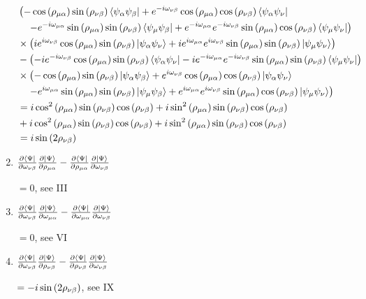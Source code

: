 \documentclass{aux/ttuthes2007}
\newcommand{\bra}[1]{\ensuremath{\left\langle#1\right\vert}}
\newcommand{\ket}[1]{\ensuremath{\left|#1\right\rangle}}
\newcommand{\s}[1]{\sin\left( #1 \right)}
\newcommand{\ssq}[1]{\sin^2\left( #1 \right)}
\newcommand{\co}[1]{\cos\left( #1 \right)}
\newcommand{\cosq}[1]{\cos^2\left( #1 \right)}
\newcommand{\kpp}[1]{\frac{\partial \ket\Psi}{\partial #1}}
\newcommand{\bpp}[1]{\frac{\partial \bra\Psi}{\partial #1}}
\newcommand{\ind}[1]{{\uo #1 \oo #1}}
\newcommand{\uo}[1]{
		\IfEqCase{#1}{
			{0}{\mu}
			{1}{\nu}
			{2}{\xi}
		}[\PackageError{uo}{Undefined option to uo: #1}{}]
}
\newcommand{\oo}[1]{
		\IfEqCase{#1}{
			{0}{\alpha}
			{1}{\beta}
			{2}{\gamma}
		}[\PackageError{unocorb}{Undefined option to unuo: #1}{}]
}
\begin{document}
\begin{enumerate}
\begin{align*}
	&\left (
	-\co {\rho_\ind 0}\s {\rho_\ind 1}\bra {\psi_{\oo 0}\psi_{\oo 1}}
	+ e^{ -i \omega_\ind 1}\co {\rho_\ind 0 }\co {\rho_\ind 1}\bra {\psi_{\oo 0}\psi_{\uo 1}}
	\right .
	\\
	&\left .
	\quad - e^{ -i \omega_\ind 0}\s {\rho_\ind 0}\s {\rho_\ind 1}\bra{\psi_{\uo 0} \psi_{\oo 1}} 
	+ e^{ -i \omega_\ind 0}e^{ -i \omega_\ind 1}\s {\rho_\ind 0}\co {\rho_\ind 1}\bra{\psi_{\uo 0} \psi_{\uo 1}} 
	\right )
	\\
	&\times\left (
	ie^{i\omega_\ind 1}\co {\rho_\ind 0 }\s {\rho_\ind 1}\ket {\psi_{\oo 0}\psi_{\uo 1}} 
	+ ie^{i\omega_\ind 0}e^{i\omega_\ind 1}\s {\rho_\ind 0}\s {\rho_\ind 1}\ket{\psi_{\uo 0} \psi_{\uo 1}} 
	\right )
	\\
	&-\left (
	-i e^{ -i \omega_\ind 1}\co {\rho_\ind 0 }\s {\rho_\ind 1}\bra {\psi_{\oo 0}\psi_{\uo 1}}
	-i e^{ -i \omega_\ind 0}e^{ -i \omega_\ind 1}\s {\rho_\ind 0}\s {\rho_\ind 1}\bra{\psi_{\uo 0} \psi_{\uo 1}} 
	\right )
	\\
	&\times\left (
	-\co {\rho_\ind 0}\s {\rho_\ind 1}\ket {\psi_{\oo 0}\psi_{\oo 1}}
	+ e^{i\omega_\ind 1}\co {\rho_\ind 0 }\co {\rho_\ind 1}\ket {\psi_{\oo 0}\psi_{\uo 1}}
	\right .
	\\
	&\left .
	\quad - e^{i\omega_\ind 0}\s {\rho_\ind 0}\s {\rho_\ind 1}\ket{\psi_{\uo 0} \psi_{\oo 1}} 
	+ e^{i\omega_\ind 0}e^{i\omega_\ind 1}\s {\rho_\ind 0}\co {\rho_\ind 1}\ket{\psi_{\uo 0} \psi_{\uo 1}} 
	\right )
	\\
	&= 
	i\cosq {\rho_\ind 0}\s {\rho_\ind 1}\co {\rho_\ind 1}
	+i\ssq {\rho_\ind 0}\s {\rho_\ind 1}\co {\rho_\ind 1}
	\\
	&+i\cosq {\rho_\ind 0}\s {\rho_\ind 1}\co {\rho_\ind 1}
	+ i\ssq  {\rho_\ind 0}\s {\rho_\ind 1}\co {\rho_\ind 1}
	\\
	&= i\s {2\rho_\ind 1}
\end{align*}

	\item $ \bpp{\omega_\ind 1} \kpp{\rho_\ind 0}
	- \bpp{\rho_\ind 0} \kpp{\omega_\ind 1}$

	$= 0$, see III

	\item $ \bpp{\omega_\ind 1} \kpp{\omega_\ind 0}
	- \bpp{\omega_\ind 0} \kpp{\omega_\ind 1}$

	$= 0$, see VI

	\item $ \bpp{\omega_\ind 1} \kpp{\rho_\ind 1}
	- \bpp{\rho_\ind 1} \kpp{\omega_\ind 1}$

	$= -i\s {2\rho_\ind 1}$, see IX
\end{enumerate}
\end{document}
